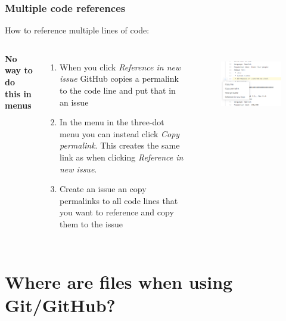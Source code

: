 \documentclass[aspectratio=169]{beamer} %
\begin{document}
\begin{frame}
	\frametitle{Multiple code references}
	
	How to reference multiple lines of code: 
	\vspace{.5cm}
	
	\begin{columns}[c] 
		
		\textbf{No way to do this in menus}
		\begin{enumerate}
			\item When you click \textit{Reference in new issue} GitHub copies a permalink to the code line and put that in an issue
			\item In the menu in the three-dot menu you can instead click \textit{Copy permalink}. This creates the same link as when clicking \textit{Reference in new issue}. 
			\item Create an issue an copy permalinks to all code lines that you want to reference and copy them to the issue
		\end{enumerate}	
		
		\begin{figure}
			\centering
			\includegraphics[width=1\linewidth]{img/reference-code-line-issue.png}
			\label{fig:branches}
		\end{figure}
	\end{columns}
\end{frame}

\section{Where are files when using Git/GitHub?}
\end{document}
